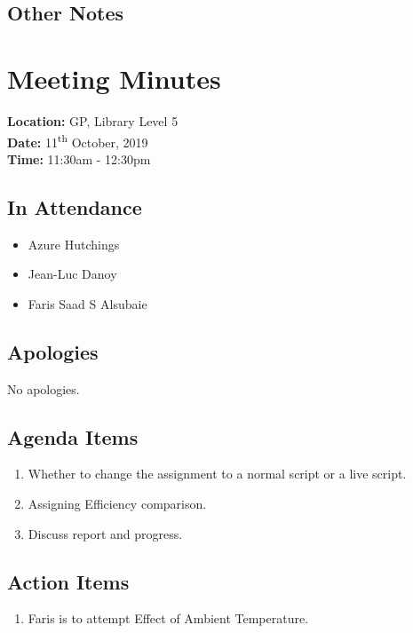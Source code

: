 \documentclass{article}
\begin{document}
\subsection*{Other Notes}

\pagebreak

\section{Meeting Minutes}
\textbf{Location:} GP, Library Level 5 \\
\textbf{Date:} 11\textsuperscript{th} October, 2019 \\
\textbf{Time:} 11:30am - 12:30pm

\subsection*{In Attendance}
\begin{itemize}
\item Azure Hutchings
\item Jean-Luc Danoy
\item Faris Saad S Alsubaie
\end{itemize}

\subsection*{Apologies}
No apologies. 

\subsection*{Agenda Items}
\begin{enumerate}
\item Whether to change the assignment to a normal script or a live script.
\item Assigning Efficiency comparison. 
\item Discuss report and progress.
\end{enumerate}

\subsection*{Action Items}
\begin{enumerate}
\item Faris is to attempt Effect of Ambient Temperature.
\end{enumerate}
\end{document}
